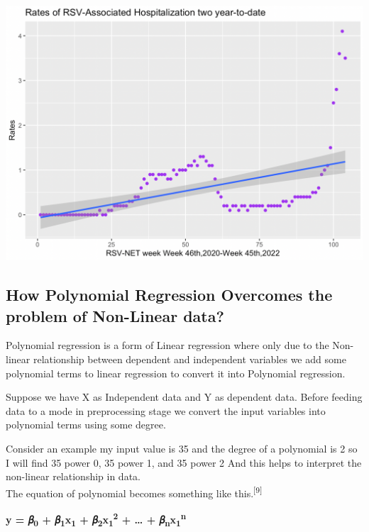 \documentclass[
  letterpaper,
  DIV=11,
  numbers=noendperiod]{scrreport}
\begin{document}
\includegraphics[width=6.66667in,height=\textheight]{./images/paste-4D5AA4F8.png}

\hypertarget{how-polynomial-regression-overcomes-the-problem-of-non-linear-data}{%
\subsection{\texorpdfstring{\textbf{How Polynomial Regression Overcomes
the problem of Non-Linear
data?}}{How Polynomial Regression Overcomes the problem of Non-Linear data?}}\label{how-polynomial-regression-overcomes-the-problem-of-non-linear-data}}

Polynomial regression is a form of Linear regression where only due to
the Non-linear relationship between dependent and independent variables
we add some polynomial terms to linear regression to convert it into
Polynomial regression.

Suppose we have X as Independent data and Y as dependent data. Before
feeding data to a mode in preprocessing stage we convert the input
variables into polynomial terms using some degree.

Consider an example my input value is 35 and the degree of a polynomial
is 2 so I will find 35 power 0, 35 power 1, and 35 power 2 And this
helps to interpret the non-linear relationship in data.\\
The equation of polynomial becomes something like
this.\textsuperscript{{[}9{]}}

\textbf{y = 𝛽\textsubscript{0} + 𝛽\textsubscript{1}x\textsubscript{1} +
𝛽\textsubscript{2}x\textsubscript{1}\textsuperscript{2} + \ldots{} +
𝛽\textsubscript{n}x\textsubscript{1}\textsuperscript{n}}
\end{document}
